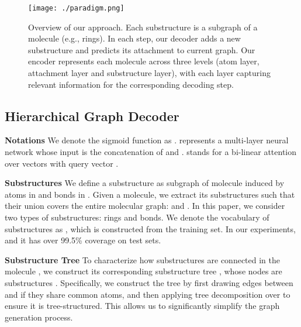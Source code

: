 \documentclass{article} \usepackage{iclr2020_conference,times}
\begin{document}
\begin{figure}[t]
    \centering
    \texttt{[image: ./paradigm.png]}
    \caption{Overview of our approach. Each substructure  is a subgraph of a molecule (e.g., rings). In each step, our decoder adds a new substructure and predicts its attachment to current graph. Our encoder represents each molecule across three levels (atom layer, attachment layer and substructure layer), with each layer capturing relevant information for the corresponding decoding step.}
    \label{fig:paradigm}
\end{figure}

\subsection{Hierarchical Graph Decoder}
\label{sec:decoder}

\textbf{Notations } We denote the sigmoid function as .  represents a multi-layer neural network whose input is the concatenation of  and .  stands for a bi-linear attention over vectors  with query vector . 

\textbf{Substructures } 
We define a substructure  as subgraph of molecule  induced by atoms in  and bonds in . Given a molecule, we extract its substructures  such that their union covers the entire molecular graph:  and . In this paper, we consider two types of substructures: rings and bonds. We denote the vocabulary of substructures as , which is constructed from the training set. In our experiments,  and it has over 99.5\% coverage on test sets.

\textbf{Substructure Tree }
To characterize how substructures are connected in the molecule , we construct its corresponding substructure tree , whose nodes are substructures . Specifically, we construct the tree by first drawing edges between  and  if they share common atoms, and then applying tree decomposition over  to ensure it is tree-structured. This allows us to significantly simplify the graph generation process.
\end{document}
